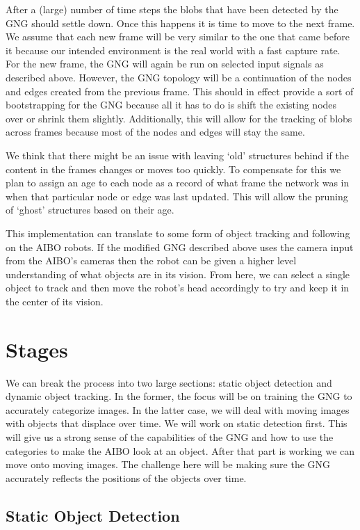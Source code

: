 \documentclass{article}
\begin{document}
After a (large) number of time steps the blobs that have been detected by the GNG should settle down. Once this happens it is time to move to the next frame. We assume that each new frame will be very similar to the one that came before it because our intended environment is the real world with a fast capture rate. For the new frame, the GNG will again be run on selected input signals as described above. However, the GNG topology will be a continuation of the nodes and edges created from the previous frame. This should in effect provide a sort of bootstrapping for the GNG because all it has to do is shift the existing nodes over or shrink them slightly. Additionally, this will allow for the tracking of blobs across frames because most of the nodes and edges will stay the same. 

We think that there might be an issue with leaving `old' structures behind if the content in the frames changes or moves too quickly. To compensate for this we plan to assign an age to each node as a record of what frame the network was in when that particular node or edge was last updated. This will allow the pruning of `ghost' structures based on their age.

This implementation can translate to some form of object tracking and following on the AIBO robots. If the modified GNG described above uses the camera input from the AIBO's cameras then the robot can be given a higher level understanding of what objects are in its vision. From here, we can select a single object to track and then move the robot's head accordingly to try and keep it in the center of its vision.

\section{Stages}

We can break the process into two large sections: static object detection and dynamic object tracking. In the former, the focus will be on training the GNG to accurately categorize images. In the latter case, we will deal with moving images with objects that displace over time. We will work on static detection first. This will give us a strong sense of the capabilities of the GNG and how to use the categories to make the AIBO look at an object. After that part is working we can move onto moving images. The challenge here will be making sure the GNG accurately reflects the positions of the objects over time.

\subsection{Static Object Detection}
\end{document}
